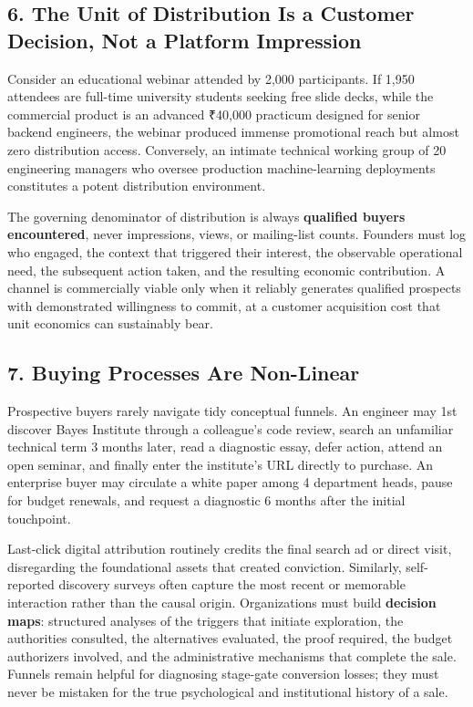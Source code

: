 \subsection*{6. The Unit of Distribution Is a Customer Decision, Not a Platform Impression}

Consider an educational webinar attended by 2,000 participants. If 1,950 attendees are full-time university students seeking free slide decks, while the commercial product is an advanced ₹40,000 practicum designed for senior backend engineers, the webinar produced immense promotional reach but almost zero distribution access. Conversely, an intimate technical working group of 20 engineering managers who oversee production machine-learning deployments constitutes a potent distribution environment.

The governing denominator of distribution is always \textbf{qualified buyers encountered}, never impressions, views, or mailing-list counts. Founders must log who engaged, the context that triggered their interest, the observable operational need, the subsequent action taken, and the resulting economic contribution. A channel is commercially viable only when it reliably generates qualified prospects with demonstrated willingness to commit, at a customer acquisition cost that unit economics can sustainably bear.

\subsection*{7. Buying Processes Are Non-Linear}

Prospective buyers rarely navigate tidy conceptual funnels. An engineer may 1st discover Bayes Institute through a colleague's code review, search an unfamiliar technical term 3 months later, read a diagnostic essay, defer action, attend an open seminar, and finally enter the institute's URL directly to purchase. An enterprise buyer may circulate a white paper among 4 department heads, pause for budget renewals, and request a diagnostic 6 months after the initial touchpoint.

Last-click digital attribution routinely credits the final search ad or direct visit, disregarding the foundational assets that created conviction. Similarly, self-reported discovery surveys often capture the most recent or memorable interaction rather than the causal origin. Organizations must build \textbf{decision maps}: structured analyses of the triggers that initiate exploration, the authorities consulted, the alternatives evaluated, the proof required, the budget authorizers involved, and the administrative mechanisms that complete the sale. Funnels remain helpful for diagnosing stage-gate conversion losses; they must never be mistaken for the true psychological and institutional history of a sale.

